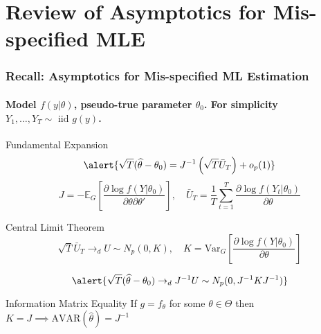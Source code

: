 \section{Review of Asymptotics for Mis-specified MLE}
\begin{frame}
  \frametitle{Recall: Asymptotics for Mis-specified ML Estimation}
  \framesubtitle{Model $f(y|\theta)$, pseudo-true parameter $\theta_0$. For simplicity $Y_1, \dots, Y_T \sim \mbox{ iid } g(y)$.}

  \pause

  \begin{block}{Fundamental Expansion}
    \vspace{-1.5em}
  \[
    \alert{\sqrt{T} ( \widehat{\theta} - \theta_0)   = J^{-1}\left(\sqrt{T} \bar{U}_T\right) + o_p(1)}
  \]
  \footnotesize
\[
      J = -\mathbb{E}_G \left[ \frac{\partial \log f(Y|\theta_0)}{\partial \theta \partial \theta'} \right], \quad
      \bar{U}_T =\frac{1}{T} \sum_{t=1}^T \frac{\partial \log f(Y_t|\theta_0)}{\partial \theta}
\] 
\end{block}

\normalsize

\vspace{-1em}

\pause

\begin{block}{Central Limit Theorem}
  \vspace{-1em}
  \footnotesize
  \[
    \sqrt{T} \bar{U}_T \rightarrow_d U \sim N_p(0, K), \quad
    K = \text{Var}_G\left[\frac{\partial \log f(Y|\theta_0)}{\partial \theta}\right]
  \] 
  \normalsize

  \vspace{-1em}

  \[
    \alert{\sqrt{T}(\widehat{\theta} - \theta_0) \rightarrow_d J^{-1}U \sim N_p(0, J^{-1}KJ^{-1})}
  \]
\end{block}

\vspace{-1em}

\pause

\begin{block}{Information Matrix Equality}
  If $g = f_\theta$ for some $\theta \in \Theta$ then $K = J \implies \text{AVAR}(\widehat{\theta}) = J^{-1}$
\end{block}

\end{frame}

